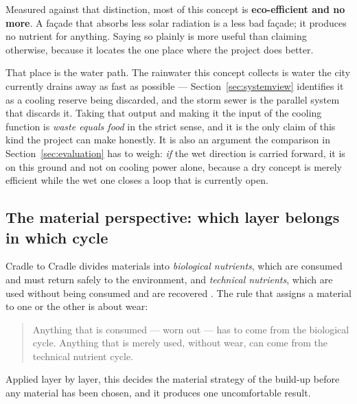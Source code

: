 Measured against that distinction, most of this concept is \textbf{eco-efficient
and no more}. A façade that absorbs less solar radiation is a less bad façade;
it produces no nutrient for anything. Saying so plainly is more useful than
claiming otherwise, because it locates the one place where the project does
better.

That place is the water path. The rainwater this concept collects is water the
city currently drains away as fast as possible --- Section~\ref{sec:systemview}
identifies it as a cooling reserve being discarded, and the storm sewer is the
parallel system that discards it. Taking that output and making it the input of
the cooling function is \emph{waste equals food} in the strict sense, and it is
the only claim of this kind the project can make honestly. It is also an argument the comparison in Section~\ref{sec:evaluation} has to
weigh: \emph{if} the wet direction is carried forward, it is on this ground and
not on cooling power alone, because a dry concept is merely efficient while the
wet one closes a loop that is currently open.

\subsection{The material perspective: which layer belongs in which cycle}

Cradle to Cradle divides materials into \emph{biological nutrients}, which are
consumed and must return safely to the environment, and \emph{technical
nutrients}, which are used without being consumed and are recovered
\parencite{braungart2002}. The rule that assigns a material to one or the other
is about wear:

\begin{quote}
Anything that is consumed --- worn out --- has to come from the biological
cycle. Anything that is merely used, without wear, can come from the technical
nutrient cycle.
\end{quote}

Applied layer by layer, this decides the material strategy of the build-up
before any material has been chosen, and it produces one uncomfortable result.

